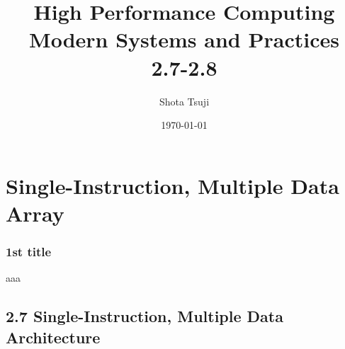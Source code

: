 \documentclass[12pt, unicode, dvipdfmx]{beamer}
\begin{document}
\title[group-reading]{High Performance Computing\\Modern Systems and Practices\\2.7-2.8}
\author{Shota Tsuji}
\date{\today}

\begin{frame}
	\titlepage
\end{frame}

\begin{frame}
	\tableofcontents
\end{frame}

\section{Single-Instruction, Multiple Data Array}
\begin{frame}[t]
	\frametitle{1st title}
	aaa
\end{frame}

\subsection{2.7 Single-Instruction, Multiple Data Architecture}
\end{document}
